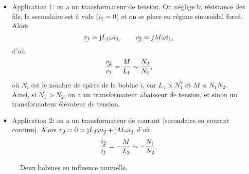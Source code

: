 \begin{itemize}
    \item Application 1: on a un transformateur de tension. On néglige la résistance des fils, la secondaire est à vide ($i_2=0$) et on se place en régime sinusoïdal forcé. Alors
    \begin{equation}
        \ubar{v_1}=\j L_1\omega i_1,\qquad \ubar{v_2}=j M\omega i_1,
    \end{equation}
    d'où
    \begin{equation}
        \frac{\ubar{v_2}}{\ubar{v_1}}=\frac{M}{L_1}\sim\frac{N_2}{N_1},
    \end{equation}
    où $N_i$ est le nombre de spires de la bobine $i$, car $L_1\propto N_1^{2}$ et $M\propto N_1 N_2$. Ainsi, si $N_1>N_2$, on a un transformateur abaisseur de tension, et sinon un transformateur élévateur de tension.
    \item Application 2: on a un transformateur de courant (secondaire en courant continu). Alors $\ubar{v_2}=0=\j L_2\omega\ubar{i_2}+\j M\omega\ubar{i_1}$ d'où
    \begin{equation}
        \frac{\ubar{i_2}}{\ubar{i_1}}=-\frac{M}{L_2}\sim-\frac{N_1}{N_2}.
    \end{equation}
\end{itemize}

\begin{figure}
    \centering
    \caption{Deux bobines en influence mutuelle.}
    \label{fig:deux_bobines_influence_mutuelle}
\end{figure}